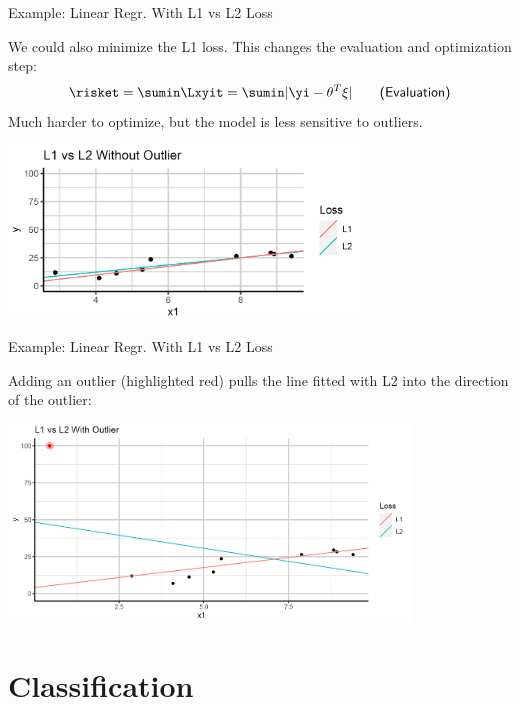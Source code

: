\begin{frame}{Example: Linear Regr. With L1 vs L2 Loss}

We could also minimize the L1 loss. This changes the evaluation and
optimization step: \[
\risket = \sumin \Lxyit = \sumin |\yi - \theta^T \xi| \qquad \textsf{(Evaluation)}
\] Much harder to optimize, but the model is less sensitive to outliers.

\scriptsize

\begin{center}
\includegraphics[width=0.7\textwidth]{plots/lin-reg-L1.png}
\end{center}

\normalsize 

\end{frame}

\begin{frame}{Example: Linear Regr. With L1 vs L2 Loss}

Adding an outlier (highlighted red) pulls the line fitted with L2 into
the direction of the outlier:

\scriptsize
\begin{center}
\includegraphics[width=0.8\textwidth]{plots/example-lin-reg.png}
\end{center}

\normalsize 

\end{frame}


\section{Classification}

